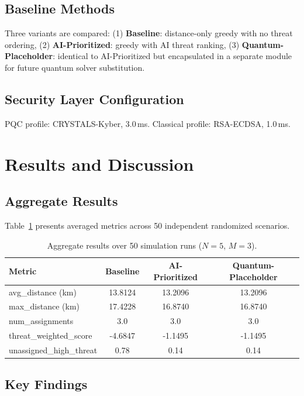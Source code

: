 \documentclass[12pt, a4paper]{article}
\begin{document}
\subsection{Baseline Methods}

Three variants are compared: (1) \textbf{Baseline}: distance-only greedy with no threat ordering, (2) \textbf{AI-Prioritized}: greedy with AI threat ranking, (3) \textbf{Quantum-Placeholder}: identical to AI-Prioritized but encapsulated in a separate module for future quantum solver substitution.

\subsection{Security Layer Configuration}

PQC profile: CRYSTALS-Kyber, 3.0\,ms. Classical profile: RSA-ECDSA, 1.0\,ms.

\section{Results and Discussion}

\subsection{Aggregate Results}

Table~\ref{tab:results} presents averaged metrics across 50 independent randomized scenarios.

\begin{table}[h]
\centering
\caption{Aggregate results over 50 simulation runs ($N=5$, $M=3$).}
\label{tab:results}
\begin{tabular}{lccc}
\toprule
\textbf{Metric} & \textbf{Baseline} & \textbf{AI-Prioritized} & \textbf{Quantum-Placeholder} \\
\midrule
avg\_distance (km)       & 13.8124 & 13.2096 & 13.2096 \\
max\_distance (km)       & 17.4228 & 16.8740 & 16.8740 \\
num\_assignments         & 3.0     & 3.0     & 3.0     \\
threat\_weighted\_score  & -4.6847 & -1.1495 & -1.1495 \\
unassigned\_high\_threat & 0.78    & 0.14    & 0.14    \\
\bottomrule
\end{tabular}
\end{table}

\subsection{Key Findings}
\end{document}
